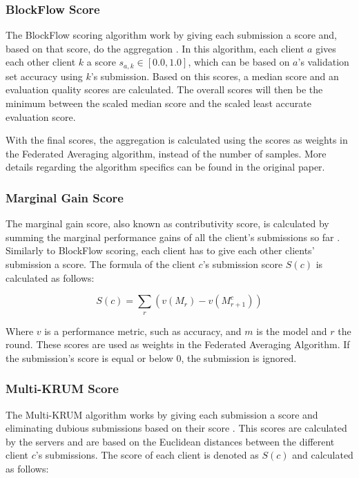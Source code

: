 \subsubsection{BlockFlow Score}

The BlockFlow scoring algorithm work by giving each submission a score and, based on that score, do the aggregation \cite{10.48550/arxiv.2007.03856}. In this algorithm, each client $a$ gives each other client $k$ a score $s_{a,k} \in [0.0, 1.0]$, which can be based on $a$'s validation set accuracy using $k$'s submission. Based on this scores, a median score and an evaluation quality scores are calculated. The overall scores will then be the minimum between the scaled median score and the scaled least accurate evaluation score.

With the final scores, the aggregation is calculated using the scores as weights in the Federated Averaging algorithm, instead of the number of samples. More details regarding the algorithm specifics can be found in the original paper.

\subsubsection{Marginal Gain Score}

The marginal gain score, also known as contributivity score, is calculated by summing the marginal performance gains of all the client's submissions so far \cite{10.48550/arxiv.2011.07516}. Similarly to BlockFlow scoring, each client has to give each other clients' submission a score. The formula of the client $c$'s submission score $S(c)$ is calculated as follows:

\begin{equation}
    \label{eq:marginal-gain}
    S(c)= \sum_r(v(M_r)-v(M^c_{r+1}))
\end{equation}

Where $v$ is a performance metric, such as accuracy, and $m$ is the model and $r$ the round. These scores are used as weights in the Federated Averaging Algorithm. If the submission's score is equal or below $0$, the submission is ignored.

\subsubsection{Multi-KRUM Score}

The Multi-KRUM algorithm works by giving each submission a score and eliminating dubious submissions based on their score \cite{9170559, Peyvandi2022, 9292450}. This scores are calculated by the servers and are based on the Euclidean distances between the different client $c$'s submissions. The score of each client is denoted as $S(c)$ and calculated as follows:

